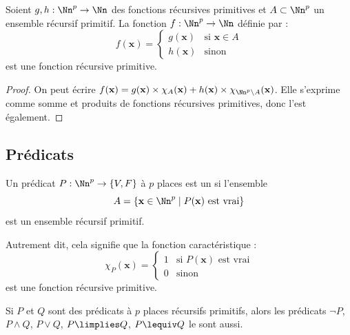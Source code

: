 \documentclass[11pt,class=report,crop=false]{standalone}
\begin{document}
\begin{proposition}
\label{prop:disjonction}
Soient $g, h : \Nn^p \to \Nn$ des fonctions récursives primitives et $A \subset \Nn^p$ un ensemble récursif primitif. 
La fonction $f : \Nn^p \to \Nn$ définie par :
\[ f(\mathbf{x}) = \begin{cases} 
    g(\mathbf{x}) & \text{si } \mathbf{x} \in A \\ 
    h(\mathbf{x}) & \text{sinon} 
\end{cases} \]
est une fonction récursive primitive.
\end{proposition}

\begin{proof}
On peut écrire $f(\mathbf{x}) = g(\mathbf{x}) \times \chi_A(\mathbf{x}) + h(\mathbf{x}) \times \chi_{\Nn^p \setminus A}(\mathbf{x})$. Elle s'exprime comme somme et produits de fonctions récursives primitives, donc l'est également.
\end{proof}


\subsection{Prédicats}

\begin{definition}
Un prédicat $P : \Nn^p \to \{V, F\}$ à $p$ places est un  si l'ensemble
\[ A = \{ \mathbf{x} \in \Nn^p \mid P(\mathbf{x}) \text{ est vrai} \} \]
est un ensemble récursif primitif.

Autrement dit, cela signifie que la fonction caractéristique :
\[ \chi_P(\mathbf{x}) = \begin{cases} 
    1 & \text{si } P(\mathbf{x}) \text{ est vrai} \\ 
    0 & \text{sinon} 
\end{cases} \]
est une fonction récursive primitive.
\end{definition}

\begin{proposition}
Si $P$ et $Q$ sont des prédicats à $p$ places récursifs primitifs, alors les prédicats $\lnot P$, $P \land Q$, $P \lor Q$, $P \limplies Q$, $P \lequiv Q$ le sont aussi.
\end{proposition}
\end{document}
